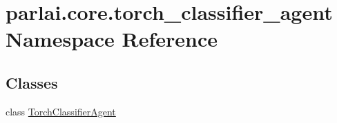 \hypertarget{namespaceparlai_1_1core_1_1torch__classifier__agent}{}\section{parlai.\+core.\+torch\+\_\+classifier\+\_\+agent Namespace Reference}
\label{namespaceparlai_1_1core_1_1torch__classifier__agent}
\subsection*{Classes}
\begin{DoxyCompactItemize}
\item 
class \hyperlink{classparlai_1_1core_1_1torch__classifier__agent_1_1TorchClassifierAgent}{Torch\+Classifier\+Agent}
\end{DoxyCompactItemize}
